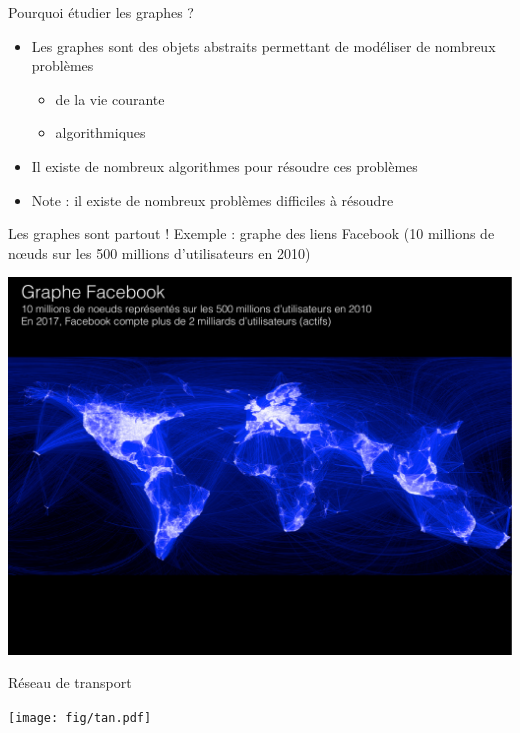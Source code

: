 
\begin{frame}{Pourquoi étudier les graphes ?}
    \begin{itemize}
        \item Les graphes sont des objets abstraits permettant de modéliser de nombreux problèmes
        \begin{itemize}
            \item de la vie courante 
            \item algorithmiques 
        \end{itemize}
        \item Il existe de nombreux algorithmes pour résoudre ces problèmes
        \item Note : il existe de nombreux problèmes difficiles à résoudre 
    \end{itemize}
\end{frame}


\begin{frame}{Les graphes sont partout !}
    Exemple : graphe des liens Facebook (10 millions de n\oe uds sur les 500 millions d'utilisateurs en 2010)
    \begin{center}
        \includegraphics[width=\textwidth]{fig/facebook.pdf}
    \end{center}
\end{frame}

\begin{frame}{Réseau de transport}
    \begin{center}
        \texttt{[image: fig/tan.pdf]}
    \end{center} 
\end{frame}

